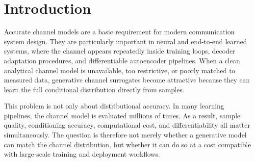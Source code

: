 \documentclass[conference]{IEEEtran}
\begin{document}
\section{Introduction}
Accurate channel models are a basic requirement for modern communication system design.
They are particularly important in neural and end-to-end learned systems, where the channel appears repeatedly inside training loops, decoder adaptation procedures, and differentiable autoencoder pipelines.
When a clean analytical channel model is unavailable, too restrictive, or poorly matched to measured data, generative channel surrogates become attractive because they can learn the full conditional distribution directly from samples.

This problem is not only about distributional accuracy.
In many learning pipelines, the channel model is evaluated millions of times.
As a result, sample quality, conditioning accuracy, computational cost, and differentiability all matter simultaneously.
The question is therefore not merely whether a generative model can match the channel distribution, but whether it can do so at a cost compatible with large-scale training and deployment workflows.
\end{document}
